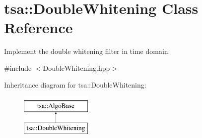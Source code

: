 \hypertarget{classtsa_1_1_double_whitening}{}\section{tsa\+:\+:Double\+Whitening Class Reference}
\label{classtsa_1_1_double_whitening}


Implement the double whitening filter in time domain.  




{\ttfamily \#include $<$Double\+Whitening.\+hpp$>$}

Inheritance diagram for tsa\+:\+:Double\+Whitening\+:\begin{figure}[H]
\begin{center}
\leavevmode
\includegraphics[height=2.000000cm]{classtsa_1_1_double_whitening}
\end{center}
\end{figure}
